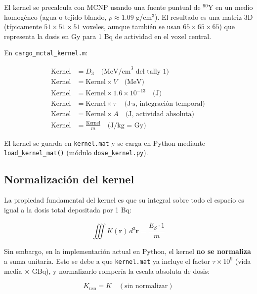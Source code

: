 \documentclass[12pt,a4paper]{article}
\begin{document}
El kernel se precalcula con MCNP usando una fuente puntual de $^{90}$Y en
un medio homogéneo (agua o tejido blando, $\rho \approx 1.09$ g/cm$^3$).
El resultado es una matriz 3D (típicamente $51 \times 51 \times 51$
voxeles, aunque también se usan $65 \times 65 \times 65$) que representa
la dosis en Gy para 1 Bq de actividad en el voxel central.

En \texttt{cargo\_mctal\_kernel.m}:

\begin{align}
    \text{Kernel} &= D_3 \quad \text{(MeV/cm}^3 \text{ del tally 1)} \\
    \text{Kernel} &= \text{Kernel} \times V \quad \text{(MeV)} \\
    \text{Kernel} &= \text{Kernel} \times 1.6 \times 10^{-13} \quad \text{(J)} \\
    \text{Kernel} &= \text{Kernel} \times \tau \quad \text{(J$\cdot$s, integración temporal)} \\
    \text{Kernel} &= \text{Kernel} \times A \quad \text{(J, actividad absoluta)} \\
    \text{Kernel} &= \frac{\text{Kernel}}{m} \quad \text{(J/kg = Gy)}
\end{align}

El kernel se guarda en \texttt{kernel.mat} y se carga en Python mediante
\texttt{load\_kernel\_mat()} (módulo \texttt{dose\_kernel.py}).

\subsection{Normalización del kernel}

La propiedad fundamental del kernel es que su integral sobre todo el
espacio es igual a la dosis total depositada por 1 Bq:

\begin{equation}
    \iiint K(\mathbf{r})\,d^3\mathbf{r} = \frac{\bar{E}_\beta \cdot 1}{m}
\end{equation}

Sin embargo, en la implementación actual en Python, el kernel \textbf{no se normaliza} a suma
unitaria. Esto se debe a que \texttt{kernel.mat} ya incluye el factor $\tau \times 10^9$ (vida
media $\times$ GBq), y normalizarlo rompería la escala absoluta de dosis:

\begin{equation}
    K_{\text{uso}} = K \quad (\text{sin normalizar})
\end{equation}
\end{document}

